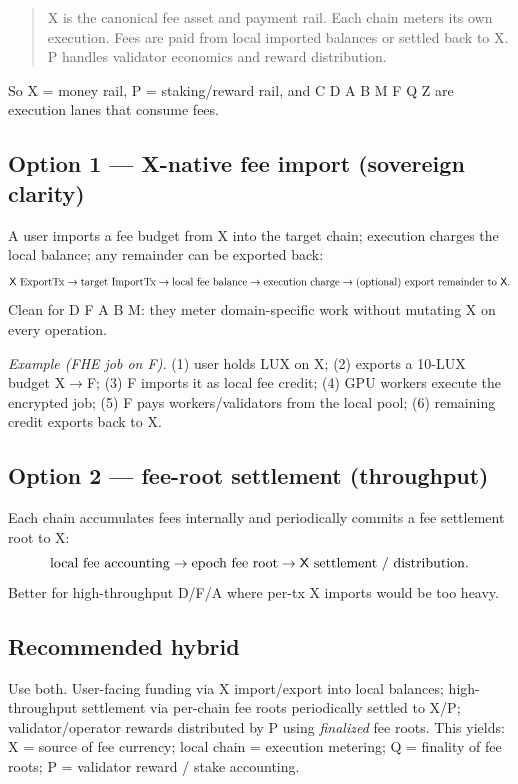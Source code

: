 \documentclass[11pt,letterpaper]{article}
\newcommand{\chain}[1]{\textsf{#1}}
\begin{document}
\begin{quote}
\chain{X} is the canonical fee asset and payment rail. Each chain meters its own
execution. Fees are paid from local imported balances or settled back to
\chain{X}. \chain{P} handles validator economics and reward distribution.
\end{quote}

So \chain{X} = money rail, \chain{P} = staking/reward rail, and \chain{C}
\chain{D} \chain{A} \chain{B} \chain{M} \chain{F} \chain{Q} \chain{Z} are
execution lanes that consume fees.

\subsection{Option 1 --- \chain{X}-native fee import (sovereign clarity)}

A user imports a fee budget from \chain{X} into the target chain; execution
charges the local balance; any remainder can be exported back:
\[
\text{\chain{X} ExportTx} \to \text{target ImportTx} \to \text{local fee balance}
\to \text{execution charge} \to \text{(optional) export remainder to \chain{X}.}
\]
Clean for \chain{D} \chain{F} \chain{A} \chain{B} \chain{M}: they meter
domain-specific work without mutating \chain{X} on every operation.

\emph{Example (FHE job on \chain{F}).} (1) user holds LUX on \chain{X};
(2) exports a 10-LUX budget \chain{X}$\to$\chain{F}; (3) \chain{F} imports it as
local fee credit; (4) GPU workers execute the encrypted job; (5) \chain{F} pays
workers/validators from the local pool; (6) remaining credit exports back to
\chain{X}.

\subsection{Option 2 --- fee-root settlement (throughput)}

Each chain accumulates fees internally and periodically commits a fee
settlement root to \chain{X}:
\[
\text{local fee accounting} \to \text{epoch fee root} \to
\text{\chain{X} settlement / distribution.}
\]
Better for high-throughput \chain{D}/\chain{F}/\chain{A} where per-tx \chain{X}
imports would be too heavy.

\subsection{Recommended hybrid}

Use both. User-facing funding via \chain{X} import/export into local balances;
high-throughput settlement via per-chain fee roots periodically settled to
\chain{X}/\chain{P}; validator/operator rewards distributed by \chain{P} using
\emph{finalized} fee roots. This yields: \chain{X} = source of fee currency;
local chain = execution metering; \chain{Q} = finality of fee roots; \chain{P} =
validator reward / stake accounting.
\end{document}
